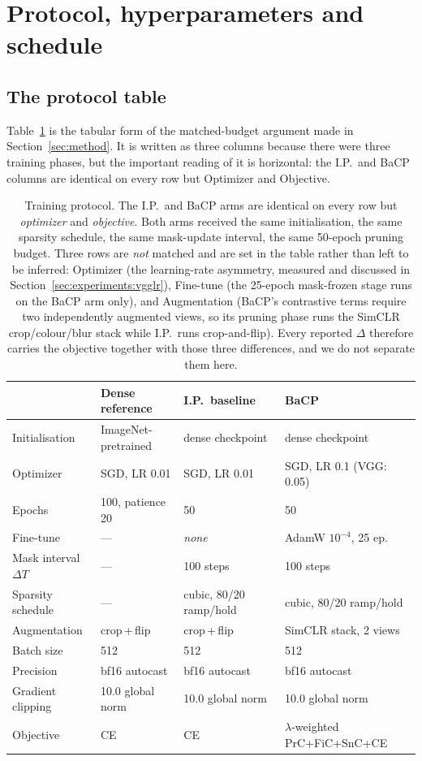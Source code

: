 \section{Protocol, hyperparameters and schedule}
\label{sec:app:protocol}

\subsection{The protocol table}

Table~\ref{tab:protocol} is the tabular form of the matched-budget argument made
in Section~\ref{sec:method}. It is written as three columns because there were
three training phases, but the important reading of it is horizontal: the I.P.\
and BaCP columns are identical on every row but Optimizer and Objective.

\begin{table}[h]
\centering
\small
\caption{Training protocol. The I.P.\ and BaCP arms are identical on every row
but \emph{optimizer} and \emph{objective}. Both arms received the same
initialisation, the same sparsity schedule, the same mask-update interval, the
same 50-epoch pruning budget. Three rows are \emph{not} matched and are set
in the table rather than left to be inferred: Optimizer (the learning-rate
asymmetry, measured and discussed in
Section~\ref{sec:experiments:vgglr}), Fine-tune (the 25-epoch mask-frozen
stage runs on the BaCP arm only), and Augmentation (BaCP's contrastive terms
require two independently augmented views, so its pruning phase runs the
SimCLR crop/colour/blur stack while I.P.\ runs crop-and-flip). Every reported
$\Delta$ therefore carries the objective together with those three
differences, and we do not separate them here.}
\label{tab:protocol}
\begin{tabular}{llll}
\toprule
 & Dense reference & I.P.\ baseline & BaCP \\
\midrule
Initialisation      & ImageNet-pretrained & dense checkpoint & dense checkpoint \\
Optimizer           & SGD, LR 0.01 & SGD, LR 0.01 & SGD, LR 0.1 (VGG: 0.05) \\
Epochs              & 100, patience 20 & 50 & 50 \\
Fine-tune           & --- & \textit{none} & AdamW $10^{-4}$, 25 ep. \\
Mask interval $\Delta T$ & --- & 100 steps & 100 steps \\
Sparsity schedule   & --- & cubic, 80/20 ramp/hold & cubic, 80/20 ramp/hold \\
Augmentation        & crop\,+\,flip & crop\,+\,flip & SimCLR stack, 2 views \\
Batch size          & 512 & 512 & 512 \\
Precision           & bf16 autocast & bf16 autocast & bf16 autocast \\
Gradient clipping   & 10.0 global norm & 10.0 global norm & 10.0 global norm \\
Objective           & CE & CE & $\lambda$-weighted PrC+FiC+SnC+CE \\
\bottomrule
\end{tabular}
\end{table}

